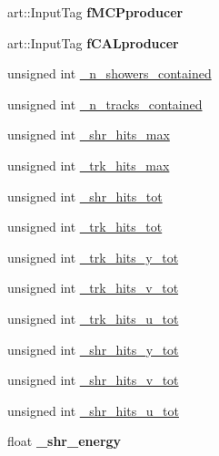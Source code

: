 \begin{DoxyCompactItemize}
\item 
\hypertarget{classselection_1_1CC0piNpSelection_a97505974a12ecb05ae7888f4647bde1f}{art\-::\-Input\-Tag {\bfseries f\-M\-C\-Pproducer}}\label{classselection_1_1CC0piNpSelection_a97505974a12ecb05ae7888f4647bde1f}

\item 
\hypertarget{classselection_1_1CC0piNpSelection_a5f6c345d0e3a50660957b2787a520a22}{art\-::\-Input\-Tag {\bfseries f\-C\-A\-Lproducer}}\label{classselection_1_1CC0piNpSelection_a5f6c345d0e3a50660957b2787a520a22}

\item 
unsigned int \hyperlink{classselection_1_1CC0piNpSelection_aebf4a69b8d7f3171ad90c382668c22ec}{\-\_\-n\-\_\-showers\-\_\-contained}
\item 
unsigned int \hyperlink{classselection_1_1CC0piNpSelection_a22c5cd4cf8882fa3cbabf25ed86d1f39}{\-\_\-n\-\_\-tracks\-\_\-contained}
\item 
unsigned int \hyperlink{classselection_1_1CC0piNpSelection_a750834ef52299d85f9596bbbafa1dffb}{\-\_\-shr\-\_\-hits\-\_\-max}
\item 
unsigned int \hyperlink{classselection_1_1CC0piNpSelection_a247d186cb641d28f8ea5b02c4f2a39bc}{\-\_\-trk\-\_\-hits\-\_\-max}
\item 
unsigned int \hyperlink{classselection_1_1CC0piNpSelection_aa6e7162371e3e343df001f0afc8a20b8}{\-\_\-shr\-\_\-hits\-\_\-tot}
\item 
unsigned int \hyperlink{classselection_1_1CC0piNpSelection_a420b9962478d7998282e03f1ccf89c2e}{\-\_\-trk\-\_\-hits\-\_\-tot}
\item 
unsigned int \hyperlink{classselection_1_1CC0piNpSelection_a76eb07fcb9190709464880c0ea7c4eba}{\-\_\-trk\-\_\-hits\-\_\-y\-\_\-tot}
\item 
unsigned int \hyperlink{classselection_1_1CC0piNpSelection_a30fe5ccb6a299f7955125aa6c9d5923d}{\-\_\-trk\-\_\-hits\-\_\-v\-\_\-tot}
\item 
unsigned int \hyperlink{classselection_1_1CC0piNpSelection_af7d0e867df8901ff3e531b4c1b96408a}{\-\_\-trk\-\_\-hits\-\_\-u\-\_\-tot}
\item 
unsigned int \hyperlink{classselection_1_1CC0piNpSelection_a6a43c3523af47860ad1682ebe14bb8e3}{\-\_\-shr\-\_\-hits\-\_\-y\-\_\-tot}
\item 
unsigned int \hyperlink{classselection_1_1CC0piNpSelection_ab6aaf4282fa9d2e5971e162c66901227}{\-\_\-shr\-\_\-hits\-\_\-v\-\_\-tot}
\item 
unsigned int \hyperlink{classselection_1_1CC0piNpSelection_afba4a31f84c2f125323b90f007bda1c6}{\-\_\-shr\-\_\-hits\-\_\-u\-\_\-tot}
\item 
\hypertarget{classselection_1_1CC0piNpSelection_abf854f061d0476dc08ae8b3d71e7a86d}{float {\bfseries \-\_\-shr\-\_\-energy}}\label{classselection_1_1CC0piNpSelection_abf854f061d0476dc08ae8b3d71e7a86d}


\end{DoxyCompactItemize}
